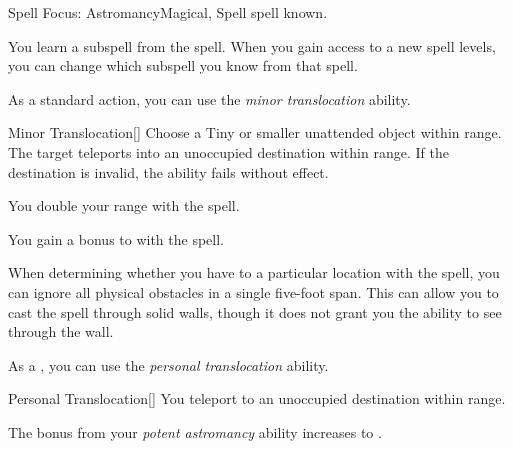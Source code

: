     \begin{feat}{Spell Focus: Astromancy}{Magical, Spell}
        \featpre {} spell known.

         You learn a subspell from the  spell.
        When you gain access to a new spell levels, you can change which subspell you know from that spell.

         As a standard action, you can use the \textit{minor translocation} ability.
        \begin{ability}{Minor Translocation}[]
            Choose a Tiny or smaller unattended object within \rngclose range.
            The target teleports into an unoccupied destination within range.
            If the destination is invalid, the ability fails without effect.
        \end{ability}

         You double your range with the  spell.

         You gain a  bonus to  with the  spell. 

         When determining whether you have  to a particular location with the  spell, you can ignore all physical obstacles in a single five-foot span.
        This can allow you to cast the spell through solid walls, though it does not grant you the ability to see through the wall.

         As a , you can use the \textit{personal translocation} ability.
        \begin{ability}{Personal Translocation}[]
            You teleport to an unoccupied destination within \rngclose range.
        \end{ability}

         The bonus from your \textit{potent astromancy} ability increases to .
    \end{feat}

